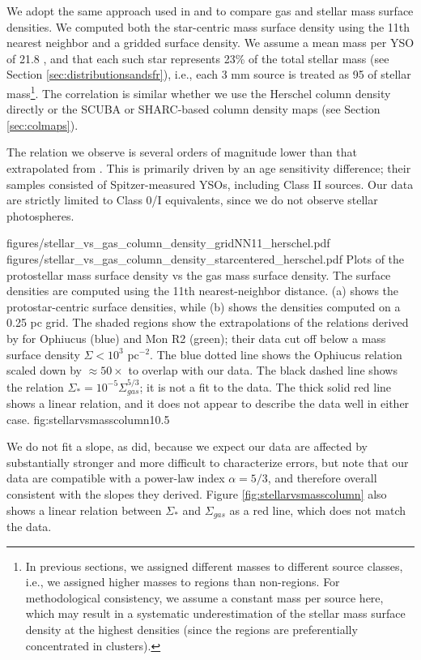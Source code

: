 \documentclass[twocolumn]{aastex61}
\begin{document}
We adopt the same approach used in \citet{Gutermuth2009a} and
\citet{Gutermuth2011a} to compare gas and stellar mass surface densities.  We
computed both the star-centric mass surface density using the 11th nearest
neighbor and a gridded surface density.  We assume a mean mass per YSO of 21.8
\msun, and that each such star represents 23\% of the total stellar mass (see
Section \ref{sec:distributionsandsfr}), i.e., each 3 mm source is treated as 95
\msun of stellar mass\footnote{In previous sections, we assigned different
masses to different source classes, i.e., we assigned higher masses to \hii regions
than non-\hii regions.  For methodological consistency, we assume a constant mass
per source here, which may result in a systematic underestimation of 
the stellar mass surface density at the highest densities (since the \hii regions
are preferentially concentrated in clusters).}. The correlation is similar whether we use the Herschel
column density directly or the SCUBA or SHARC-based column density maps (see
Section \ref{sec:colmaps}).  

The relation we observe is several orders of magnitude lower than that
extrapolated from \citet{Gutermuth2011a}.  This is primarily driven by an age
sensitivity difference; their samples consisted of Spitzer-measured YSOs,
including Class II sources.  Our data are strictly limited to Class 0/I
equivalents, since we do not observe stellar photospheres.

\FigureTwo
{figures/stellar_vs_gas_column_density_gridNN11_herschel.pdf}
{figures/stellar_vs_gas_column_density_starcentered_herschel.pdf}
{Plots of the protostellar mass surface density vs the gas mass surface
density.  The surface densities are computed using the 11th nearest-neighbor
distance.  (a) shows the protostar-centric surface densities, while (b) shows
the densities computed on a 0.25 pc grid.  The shaded regions
show the extrapolations of the relations derived by \citet{Gutermuth2011a}
for Ophiucus (blue) and Mon R2 (green); their data cut off below a mass
surface density $\Sigma < 10^3$ \msun pc$^{-2}$. 
The blue dotted line shows the Ophiucus relation scaled down by
$\approx50\times$ to overlap with our data.
The black dashed line shows the relation $\Sigma_* = 10^{-5}
\Sigma_{gas}^{5/3}$; it is not a fit to the data.
The thick solid red line shows a linear relation, and it does not appear
to describe the data well in either case.}
{fig:stellarvsmasscolumn}{1}{0.5\textwidth}

We do not fit a slope, as \citet{Gutermuth2011a} did, because we expect our
data are affected by substantially stronger and more difficult to characterize
errors, but note that our data are compatible with a power-law index
$\alpha=5/3$, and therefore overall consistent with the slopes they
derived.  Figure \ref{fig:stellarvsmasscolumn} also shows a linear relation
between $\Sigma_*$ and $\Sigma_{gas}$ as a red line, which does not match
the data.
\end{document}
